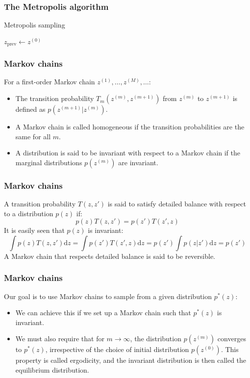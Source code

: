 \documentclass{beamer}
\begin{document}
\begin{frame}
    \frametitle{The Metropolis algorithm}
    \begin{algorithm}[H]
        \caption{Metropolis sampling}
        $z_{\mathrm{prev}}\gets{}z^{(0)}$\;
        \;
    \end{algorithm}
\end{frame}

\begin{frame}
    \frametitle{Markov chains}
    For a first-order Markov chain $z^{(1)},\hdots,z^{(M)},\hdots$:
    \begin{itemize}
        \item The transition probability $T_{m}(z^{(m)},z^{(m+1)})$ from $z^{(m)}$ to $z^{(m+1)}$ is defined as $p(z^{(m+1)}|z^{(m)})$.
        \item A Markov chain is called homogeneous if the transition probabilities are the same for all $m$.
        \item A distribution is said to be invariant with respect to a Markov chain if the marginal distributions $p(z^{(m)})$ are invariant.
    \end{itemize}
\end{frame}

\begin{frame}
    \frametitle{Markov chains}
    A transition probability $T(z,z')$ is said to satisfy detailed balance with respect to a distribution $p(z)$ if:
    \begin{equation*}
        p(z)T(z,z')=p(z')T(z',z)
    \end{equation*}
    It is easily seen that $p(z)$ is invariant:
    \begin{equation*}
        \int{}p(z)T(z,z')\mathrm{d}z=\int{}p(z')T(z',z)\mathrm{d}z=p(z')\int{}p(z|z')\mathrm{d}z=p(z')
    \end{equation*}
    A Markov chain that respects detailed balance is said to be reversible.
\end{frame}

\begin{frame}
    \frametitle{Markov chains}
    Our goal is to use Markov chains to sample from a given distribution $p^{*}(z)$:
    \begin{itemize}
        \item We can achieve this if we set up a Markov chain such that $p^{*}(z)$ is invariant.
        \item We must also require that for $m\to\infty$, the distribution $p(z^{(m)})$ converges to $p^{*}(z)$, irrespective of the choice of initial distribution $p(z^{(0)})$. This property is called ergodicity, and the invariant distribution is then called the equilibrium distribution.
    \end{itemize}
\end{frame}
\end{document}
